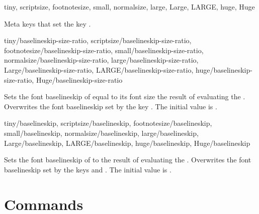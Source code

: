 \documentclass{beerydoc}
\begin{document}
\begin{variable}
  {
    tiny,
    scriptsize,
    footnotesize,
    small,
    normalsize,
    large,
    Large,
    LARGE,
    huge,
    Huge
  }
  \begin{syntax}
  \end{syntax}
  Meta keys that set the key
  .
\end{variable}

\begin{variable}
  {
    tiny/baselineskip-size-ratio,
    scriptsize/baselineskip-size-ratio,
    footnotesize/baselineskip-size-ratio,
    small/baselineskip-size-ratio,
    normalsize/baselineskip-size-ratio,
    large/baselineskip-size-ratio,
    Large/baselineskip-size-ratio,
    LARGE/baselineskip-size-ratio,
    huge/baselineskip-size-ratio,
    Huge/baselineskip-size-ratio
  }
  \begin{syntax}
  \end{syntax}
  Sets the font baselineskip of  equal to its
  font size \texttimes{} the result of evaluating the .
  Overwrites the font baselineskip set by the key
  .
  The initial value is .
\end{variable}

\begin{variable}
  {
    tiny/baselineskip,
    scriptsize/baselineskip,
    footnotesize/baselineskip,
    small/baselineskip,
    normalsize/baselineskip,
    large/baselineskip,
    Large/baselineskip,
    LARGE/baselineskip,
    huge/baselineskip,
    Huge/baselineskip
  }
  \begin{syntax}
  \end{syntax}
  Sets the font baselineskip of  to the result of
  evaluating the .
  Overwrites the font baselineskip set by the keys
   and
  .
  The initial value is .
\end{variable}


\section{Commands}
\label{sec:commands}
\end{document}
